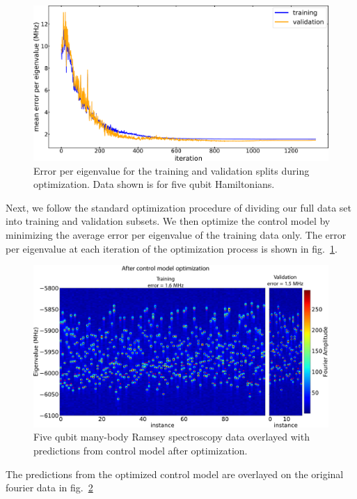 \begin{figure}[h]
    \begin{center}
        \includegraphics[width=150 mm]{./PDF/tv_error_during_opt.pdf}
    \end{center}
        \caption{
        Error per eigenvalue for the training and validation splits during optimization.
        Data shown is for five qubit Hamiltonians.
        }
    \label{error_during_optimization_training_validation}
\end{figure}
Next, we follow the standard optimization procedure of dividing our full data set into training and validation subsets.
We then optimize the control model by minimizing the average error per eigenvalue of the training data only.
The error per eigenvalue at each iteration of the optimization process is shown in fig.~\ref{error_during_optimization_training_validation}.

\begin{figure}[h]
    \begin{center}
        \includegraphics[width=150 mm]{./PDF/fourier_amp_2d_tv_post.pdf}
    \end{center}
        \caption{
        Five qubit many-body Ramsey spectroscopy data overlayed with predictions from control model after optimization.
        }
    \label{mbr_benchmark_post_optimization}
\end{figure}
The predictions from the optimized control model are overlayed on the original fourier data in fig.~\ref{mbr_benchmark_post_optimization}

